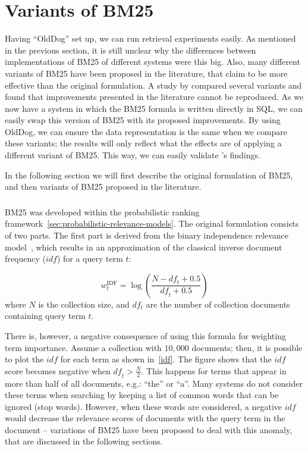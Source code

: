 \section{Variants of BM25}
\label{ir_db_variants}
Having ``OldDog'' set up, we can run retrieval experiments easily. As mentioned in the previous section, it is still unclear why the differences between implementations of BM25 of different systems were this big. Also, many different variants of BM25 have been proposed in the literature, that claim to be more effective than the original formulation. A study by \citet{trotman-bm25} compared several variants and found that improvements presented in the literature cannot be reproduced. 
As we now have a system in which the BM25 formula is written directly in SQL, we can easily swap this version of BM25 with its proposed improvements. By using OldDog, we can ensure the data representation is the same when we compare these variants; the results will only reflect what the effects are of applying a different variant of BM25. This way, we can easily validate \citeauthor{trotman-bm25}'s findings.

In the following section we will first describe the original formulation of BM25, and then variants of BM25 proposed in the literature. 

\subsubsection{} 
BM25 was developed within the probabilistic ranking framework~\ref{sec:probabilistic-relevance-models}. The original formulation consists of two parts. The first part is derived from the binary independence relevance model~\citep{bm25-beyond}, which results in an approximation of the classical inverse document frequency ($\mathit{idf}$) for a query term $t$:

\begin{equation} 
	w_t^{\text{IDF}} = \log\left(\frac{N-\mathit{df}_t+0.5}{\mathit{df}_t+0.5}\right)
\end{equation}
where $N$ is the collection size, and $df_t$ are the number of collection documents containing query term $t$.  

There is, however, a negative consequence of using this formula for weighting term importance. Assume a collection with $10,000$ documents; then, it is possible to plot the $\mathit{idf}$ for each term as shown in~\cref{idf}. The figure shows that the $\mathit{idf}$ score becomes negative when $\mathit{df}_t > \frac{N}{2}$. This happens for terms that appear in more than half of all documents, e.g.: ``the'' or ``a''. Many systems do not consider these terms when searching by keeping a list of common words that can be ignored (stop words). However, when these words are considered,  a negative $\mathit{idf}$ would decrease the relevance scores of documents with the query term in the document -- variations of BM25 have been proposed to deal with this anomaly, that are discussed in the following sections. 

